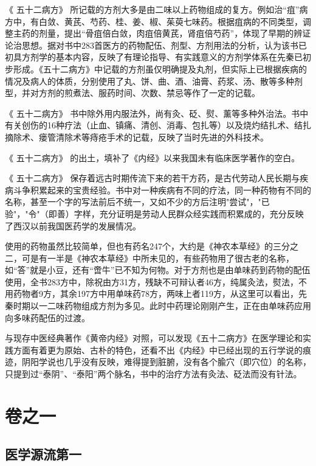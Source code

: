 \documentclass{ctexbook}
\begin{document}
	《 五十二病方》 所记载的方剂大多是由二味以上药物组成的复方。例如治“疽”病方中，有白敛、黄芪、芍药、桂、姜、椒、茱萸七味药。根据疽病的不同类型，调整主药的剂量，提出“骨疽倍白敛，肉疽倍黄芪，肾疽倍芍药”，体现了早期的辨证论治思想。据对书中283首医方的药物配伍、剂型、方剂用法的分析，认为该书已初具方剂学的基本内容，反映了有理论指导、有实践意义的方剂学体系在先秦已初步形成。《五十二病方》中记载的方剂虽仅明确提及丸剂，但实际上已根据疾病的情况及病人的体质，分别使用了丸、饼、曲、酒、油膏、药浆、汤、散等多种剂型，并对方剂的煎煮法、服药时间、次数、禁忌等作了一定的记载。
	
	《 五十二病方》 书中除外用内服法外，尚有灸、砭、熨、薰等多种外治法。书中有关创伤的16种疗法（止血、镇痛、清创、消毒、包扎等）以及烧灼结扎术、结扎摘除术、瘘管清除术等痔疮手术的记载，反映了当时先进的外科技术。
	
	《 五十二病方》 的出土，填补了《内经》以来我国未有临床医学著作的空白。
		
	《 五十二病方》 保存着远古时期传流下来的若干方药，是古代劳动人民长期与疾病斗争积累起来的宝贵经验。书中对一种疾病有不同的疗法，同一种药物有不同的名称，甚至一个字的写法前后不统一，又如不少的方后注明"尝试"，"已验"，"令"（即善）字样，充分证明是劳动人民群众经实践而积累成的，充分反映了西汉以前我国医药学的发展情况。
	
	使用的药物虽然比较简单，但也有药名247个，大约是《神农本草经》的三分之二，可是有一半是《神农本草经》中所未见的，有些药物用了很古老的名称，如“答”就是小豆，还有“啻牛”已不知为何物。对于方剂也是由单味药到药物的配伍使用，全书283方中，除祝由方31方，残缺不可辩认者46方，纯属灸法，熨法，不用药物者9方，其余197方中用单味药78方，两味上者119方，从这里可以看出，先秦时期以一二味药物组成方剂为多见。此时中药理论刚刚产生，正在由单味药应用向多味药配伍的过渡。
	
	与现存中医经典著作《黄帝内经》对照，可以发现《五十二病方》在医学理论和实践方面有着更为原始、古朴的特色，还看不出《内经》中已经出现的五行学说的痕迹，阴阳学说也几乎没有反映，难得提到脏腑，没有各个腧穴（即穴位）的名称，只提到过“泰阴”、“泰阳”两个脉名，书中的治疗方法有灸法、砭法而没有针法。

	\chapter{卷之一}
	\section{医学源流第一}
\end{document}
